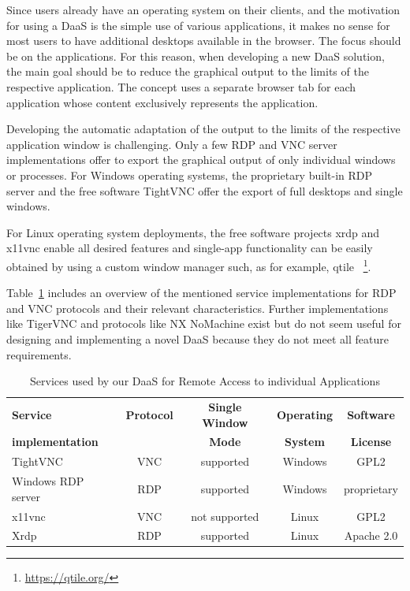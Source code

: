 \documentclass[runningheads]{llncs}
\begin{document}
Since users already have an operating system on their clients,
and the motivation for using a DaaS is the simple use of various applications,
it makes no sense for most users to have additional desktops available in the browser.
The focus should be on the applications.
For this reason, when developing a new DaaS solution,
the main goal should be to reduce the graphical output
to the limits of the respective application.
The concept uses a separate browser tab for each application
whose content exclusively represents the application.

Developing the automatic adaptation of the output
to the limits of the respective application window is challenging.
Only a few RDP and VNC server implementations offer to export the graphical output
of only individual windows or processes.
For Windows operating systems, the proprietary built-in RDP server
and the free software TightVNC offer the export of full desktops and single windows.

For Linux operating system deployments,
the free software projects xrdp and x11vnc enable all desired features
and single-app functionality can be easily obtained
by using a custom window manager such, as for example, qtile
~\footnote{\url{https://qtile.org/}}.

Table~\ref{tab:DaaS_Services_Overview} includes an overview
of the mentioned service implementations for RDP and VNC protocols
and their relevant characteristics.
Further implementations like TigerVNC and protocols like NX NoMachine exist
but do not seem useful for designing and implementing a novel DaaS because
they do not meet all feature requirements.~\cite{OJCC_2023v8i1n01_Baun}

\begin{table}
	\centering
	\caption{Services used by our DaaS for Remote Access to individual Applications}
	\begin{tabular}{|l|c|c|c|c|}
		\hline
		\textbf{Service}        & \textbf{Protocol} & \textbf{Single Window} & \textbf{Operating} & \textbf{Software} \\
		\textbf{implementation} &                   & \textbf{Mode}          & \textbf{System}    & \textbf{License}  \\
		\hline
		TightVNC                & VNC               & supported              & Windows            & GPL2              \\
		\hline
		Windows RDP server      & RDP               & supported              & Windows            & proprietary       \\
		\hline
		x11vnc                  & VNC               & not supported          & Linux              & GPL2              \\
		\hline
		Xrdp                    & RDP               & supported              & Linux              & Apache 2.0        \\
		\hline
	\end{tabular}
	\label{tab:DaaS_Services_Overview}
\end{table}
\end{document}
